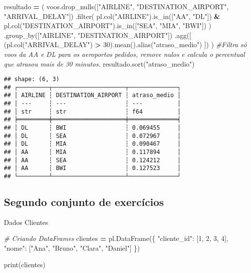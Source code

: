\documentclass[
]{article}
\newenvironment{Shaded}{\begin{snugshade}}{\end{snugshade}}
\newcommand{\BuiltInTok}[1]{#1}
\newcommand{\CommentTok}[1]{\textcolor[rgb]{0.56,0.35,0.01}{\textit{#1}}}
\newcommand{\DecValTok}[1]{\textcolor[rgb]{0.00,0.00,0.81}{#1}}
\newcommand{\NormalTok}[1]{#1}
\newcommand{\OperatorTok}[1]{\textcolor[rgb]{0.81,0.36,0.00}{\textbf{#1}}}
\newcommand{\StringTok}[1]{\textcolor[rgb]{0.31,0.60,0.02}{#1}}
\begin{document}
\begin{Shaded}
\begin{Highlighting}[]
\NormalTok{resultado }\OperatorTok{=}\NormalTok{ (}
\NormalTok{  voos.drop\_nulls([}\StringTok{"AIRLINE"}\NormalTok{, }\StringTok{"DESTINATION\_AIRPORT"}\NormalTok{, }\StringTok{"ARRIVAL\_DELAY"}\NormalTok{])}
\NormalTok{  .}\BuiltInTok{filter}\NormalTok{(}
\NormalTok{    pl.col(}\StringTok{"AIRLINE"}\NormalTok{).is\_in([}\StringTok{"AA"}\NormalTok{, }\StringTok{"DL"}\NormalTok{]) }\OperatorTok{\&}
\NormalTok{    pl.col(}\StringTok{"DESTINATION\_AIRPORT"}\NormalTok{).is\_in([}\StringTok{"SEA"}\NormalTok{, }\StringTok{"MIA"}\NormalTok{, }\StringTok{"BWI"}\NormalTok{])}
\NormalTok{    )}
\NormalTok{    .group\_by([}\StringTok{"AIRLINE"}\NormalTok{, }\StringTok{"DESTINATION\_AIRPORT"}\NormalTok{])}
\NormalTok{    .agg([}
\NormalTok{      (pl.col(}\StringTok{"ARRIVAL\_DELAY"}\NormalTok{) }\OperatorTok{\textgreater{}} \DecValTok{30}\NormalTok{).mean().alias(}\StringTok{"atraso\_medio"}\NormalTok{)}
\NormalTok{      ])}
\NormalTok{) }\CommentTok{\#Filtra só voos da AA e DL para os aeroportos pedidos, remove nulos e calcula o percentual que atrasou mais de 30 minutos.}
\NormalTok{resultado.sort(}\StringTok{"atraso\_medio"}\NormalTok{)}
\end{Highlighting}
\end{Shaded}

\begin{verbatim}
## shape: (6, 3)
## ┌─────────┬─────────────────────┬──────────────┐
## │ AIRLINE ┆ DESTINATION_AIRPORT ┆ atraso_medio │
## │ ---     ┆ ---                 ┆ ---          │
## │ str     ┆ str                 ┆ f64          │
## ╞═════════╪═════════════════════╪══════════════╡
## │ DL      ┆ BWI                 ┆ 0.069455     │
## │ DL      ┆ SEA                 ┆ 0.072967     │
## │ DL      ┆ MIA                 ┆ 0.090467     │
## │ AA      ┆ MIA                 ┆ 0.117894     │
## │ AA      ┆ SEA                 ┆ 0.124212     │
## │ AA      ┆ BWI                 ┆ 0.127523     │
## └─────────┴─────────────────────┴──────────────┘
\end{verbatim}

\subsection{Segundo conjunto de
exercícios}\label{segundo-conjunto-de-exercuxedcios}

Dados Clientes

\begin{Shaded}
\begin{Highlighting}[]
\CommentTok{\# Criando DataFrames}
\NormalTok{clientes }\OperatorTok{=}\NormalTok{ pl.DataFrame(\{}
    \StringTok{"cliente\_id"}\NormalTok{: [}\DecValTok{1}\NormalTok{, }\DecValTok{2}\NormalTok{, }\DecValTok{3}\NormalTok{, }\DecValTok{4}\NormalTok{],}
    \StringTok{"nome"}\NormalTok{: [}\StringTok{"Ana"}\NormalTok{, }\StringTok{"Bruno"}\NormalTok{, }\StringTok{"Clara"}\NormalTok{, }\StringTok{"Daniel"}\NormalTok{]}
\NormalTok{\})}

\BuiltInTok{print}\NormalTok{(clientes)}
\end{Highlighting}
\end{Shaded}
\end{document}
